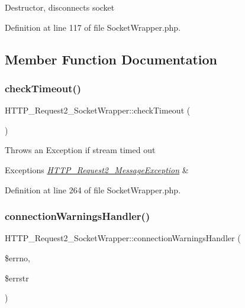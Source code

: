 Destructor, disconnects socket 

Definition at line 117 of file Socket\+Wrapper.\+php.



\subsection{Member Function Documentation}
\mbox{\label{classHTTP__Request2__SocketWrapper_a4325bbe1d479b4e3dd106624c38118a3}} 
\subsubsection{\texorpdfstring{check\+Timeout()}{checkTimeout()}}
{\footnotesize\ttfamily H\+T\+T\+P\+\_\+\+Request2\+\_\+\+Socket\+Wrapper\+::check\+Timeout (\begin{DoxyParamCaption}{ }\end{DoxyParamCaption})\hspace{0.3cm}{\ttfamily [protected]}}

Throws an Exception if stream timed out


\begin{DoxyExceptions}{Exceptions}
{\em \hyperlink{classHTTP__Request2__MessageException}{H\+T\+T\+P\+\_\+\+Request2\+\_\+\+Message\+Exception}} & \\
\hline
\end{DoxyExceptions}


Definition at line 264 of file Socket\+Wrapper.\+php.

\mbox{\label{classHTTP__Request2__SocketWrapper_aa26d77c799f9525f11adc23c7b4e7698}} 
\subsubsection{\texorpdfstring{connection\+Warnings\+Handler()}{connectionWarningsHandler()}}
{\footnotesize\ttfamily H\+T\+T\+P\+\_\+\+Request2\+\_\+\+Socket\+Wrapper\+::connection\+Warnings\+Handler (\begin{DoxyParamCaption}\item[{}]{\$errno,  }\item[{}]{\$errstr }\end{DoxyParamCaption})\hspace{0.3cm}{\ttfamily [protected]}}


